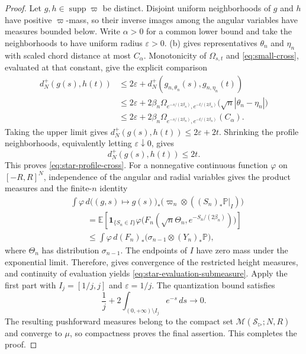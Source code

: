 \documentclass[10pt,a4paper]{amsart}
\numberwithin{equation}{section}
\DeclareMathOperator{\supp}{supp}
\newcommand{\eps}{\varepsilon}
\begin{document}
\begin{proof}
Let $g,h\in\supp\varpi$ be distinct.  Disjoint uniform neighborhoods of $g$ and $h$ have positive $\varpi$-mass, so their inverse images among the angular variables have measures bounded below.  Write $\alpha>0$ for a common lower bound and take the neighborhoods to have uniform radius $\eps>0$.  (b) gives representatives $\theta_n$ and $\eta_n$ with scaled chord distance at most $C_\alpha$.  Monotonicity of $\Omega_{s,t}$ and \eqref{eq:small-cross}, evaluated at that constant, give the explicit comparison
\[
 \begin{aligned}
d_N^+(g(s),h(t)) &\le2\eps+d_N^+(g_{n,\theta_n}(s),g_{n,\eta_n}(t))\\
 &\le2\eps+2\beta_n\Omega_{e^{-s/(2\beta_n)},e^{-t/(2\beta_n)}}
 \bigl(\sqrt n|\theta_n-\eta_n|\bigr)\\
 &\le2\eps+2\beta_n\Omega_{e^{-s/(2\beta_n)},e^{-t/(2\beta_n)}}(C_\alpha).
 \end{aligned}
\]
Taking the upper limit gives $d_N^+(g(s),h(t))\le2\eps+2t$.  Shrinking the profile neighborhoods, equivalently letting $\eps\downarrow0$, gives
\[ d_N^+(g(s),h(t))\le2t. \]
This proves \eqref{eq:star-profile-cross}.  For a nonnegative continuous function $\varphi$ on $[-R,R]^N$, independence of the angular and radial variables gives the product measures and the finite-$n$ identity
\[
 \begin{aligned}
&\int\varphi\,d\bigl((g,s)\mapsto g(s)\bigr)_* \bigl(\varpi_n\otimes((S_n)_*\mathbb P|_I)\bigr)\\
 &\qquad=\mathbb E\left[\mathbf 1_{\{S_n\in I\}}
 \varphi\bigl(F_n(\sqrt n\Theta_n,e^{-S_n/(2\beta_n)})\bigr)\right]\\
&\qquad\le\int\varphi\,d(F_n)_* \bigl(\sigma_{n-1}\otimes(Y_n)_*\mathbb P\bigr),
 \end{aligned}
\]
where $\Theta_n$ has distribution $\sigma_{n-1}$.  The endpoints of $I$ have zero mass under the exponential limit.  Therefore,  gives convergence of the restricted height measures, and continuity of evaluation yields \eqref{eq:star-evaluation-submeasure}.  Apply the first part with $I_j=[1/j,j]$ and $\eps=1/j$.  The quantization bound satisfies
\[ \frac1j+2\int_{(0,+\infty)\setminus I_j}e^{-s}\,ds\longrightarrow0. \]
The resulting pushforward measures belong to the compact set $\mathcal M(\mathcal S_{\rhd};N,R)$ and converge to $\mu$, so compactness proves the final assertion.  This completes the proof.
\end{proof}
\end{document}
